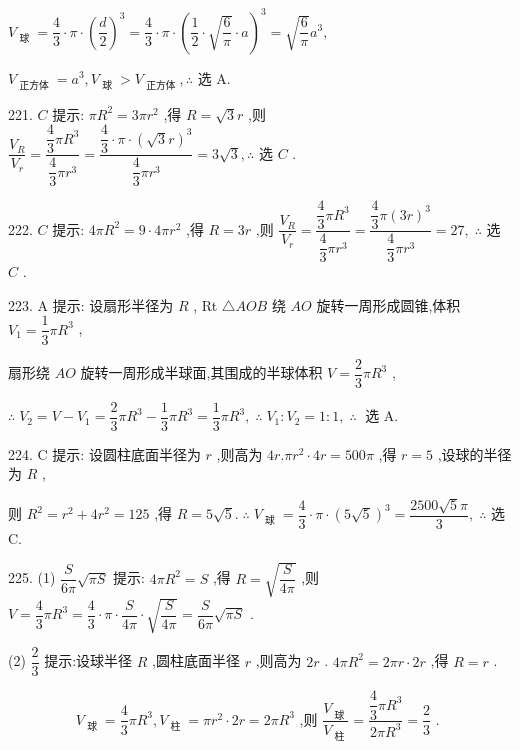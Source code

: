 ${V}_{\text{ 球 }} = \dfrac{4}{3} \cdot  \pi  \cdot  {\left( \dfrac{d}{2}\right) }^{3} = \dfrac{4}{3} \cdot  \pi  \cdot  {\left( \dfrac{1}{2} \cdot  \sqrt{\dfrac{6}{\pi }} \cdot  a\right) }^{3} = \sqrt{\dfrac{6}{\pi }}{a}^{3},$

${V}_{\text{ 正方体 }} = {a}^{3},{V}_{\text{ 球 }} > {V}_{\text{ 正方体 }},\therefore$ 选 A.

221. $C$ 提示: $\pi {R}^{2} = {3\pi }{r}^{2}$ ,得 $R = \sqrt{3}r$ ,则 $\dfrac{{V}_{R}}{{V}_{r}} = \dfrac{\dfrac{4}{3}\pi {R}^{3}}{\dfrac{4}{3}\pi {r}^{3}} = \dfrac{\dfrac{4}{3} \cdot  \pi  \cdot  {\left( \sqrt{3}r\right) }^{3}}{\dfrac{4}{3}\pi {r}^{3}} = 3\sqrt{3},\therefore$ 选 $C$ .

222. $C$ 提示: ${4\pi }{R}^{2} = 9 \cdot  {4\pi }{r}^{2}$ ,得 $R = {3r}$ ,则 $\dfrac{{V}_{R}}{{V}_{r}} = \dfrac{\dfrac{4}{3}\pi {R}^{3}}{\dfrac{4}{3}\pi {r}^{3}} = \dfrac{\dfrac{4}{3}\pi {\left( 3r\right) }^{3}}{\dfrac{4}{3}\pi {r}^{3}} = {27},\;\therefore$ 选 $C$ .

223. A 提示: 设扇形半径为 $R$ , Rt $\bigtriangleup  {AOB}$ 绕 ${AO}$ 旋转一周形成圆锥,体积 ${V}_{1} = \dfrac{1}{3}\pi {R}^{3}$ ,

扇形绕 ${AO}$ 旋转一周形成半球面,其围成的半球体积 $V = \dfrac{2}{3}\pi {R}^{3}$ ,

$\therefore \;{V}_{2} = V - {V}_{1} = \dfrac{2}{3}\pi {R}^{3} - \dfrac{1}{3}\pi {R}^{3} = \dfrac{1}{3}\pi {R}^{3},\;\therefore \;{V}_{1} : {V}_{2} = 1 : 1,\;\therefore \;$ 选 A.

224. C 提示: 设圆柱底面半径为 $r$ ,则高为 ${4r}.\pi {r}^{2} \cdot  {4r} = {500\pi }$ ,得 $r = 5$ ,设球的半径为 $R$ ,

则 ${R}^{2} = {r}^{2} + 4{r}^{2} = {125}$ ,得 $R = 5\sqrt{5}.\;\therefore \;{V}_{\text{ 球 }} = \dfrac{4}{3} \cdot  \pi  \cdot  {\left( 5\sqrt{5}\right) }^{3} = \dfrac{{2500}\sqrt{5}\pi }{3},\;\therefore$ 选 C.

225. (1) $\dfrac{S}{6\pi }\sqrt{\pi S}$ 提示: ${4\pi }{R}^{2} = S$ ,得 $R = \sqrt{\dfrac{S}{4\pi }}$ ,则 $V = \dfrac{4}{3}\pi {R}^{3} = \dfrac{4}{3} \cdot  \pi  \cdot  \dfrac{S}{4\pi } \cdot  \sqrt{\dfrac{S}{4\pi }} = \dfrac{S}{6\pi }\sqrt{\pi S}$ .

(2) $\dfrac{2}{3}$ 提示:设球半径 $R$ ,圆柱底面半径 $r$ ,则高为 ${2r}$ . ${4\pi }{R}^{2} = {2\pi r} \cdot  {2r}$ ,得 $R = r$ .

\[
{V}_{\text{ 球 }} = \dfrac{4}{3}\pi {R}^{3},{V}_{\text{ 柱 }} = \pi {r}^{2} \cdot  {2r} = {2\pi }{R}^{3}\text{ ,则 }\dfrac{{V}_{\text{ 球 }}}{{V}_{\text{ 柱 }}} = \dfrac{\dfrac{4}{3}\pi {R}^{3}}{{2\pi }{R}^{3}} = \dfrac{2}{3}\text{ . }
\]

